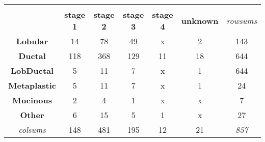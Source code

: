 \begin{table}[!h]
{\begin{tabular}{ccccccc}
                \multicolumn{1}{l}{} & \multicolumn{1}{l}{} & \multicolumn{1}{l}{} & \multicolumn{1}{l}{} & \multicolumn{1}{l}{} & \multicolumn{1}{l}{} & \multicolumn{1}{l}{} \\
                \multicolumn{1}{c|}{} & \multicolumn{1}{c|}{\textbf{stage 1}} & \multicolumn{1}{c|}{\textbf{stage 2}} & \multicolumn{1}{c|}{\textbf{stage 3}} & \multicolumn{1}{c|}{\textbf{stage 4}} & \multicolumn{1}{c|}{\textbf{unknown}} & {\color[HTML]{9B9B9B} \textit{rowsums}} \\ \hline
                \multicolumn{1}{c|}{\textbf{Lobular}} & \multicolumn{1}{c|}{14} & \multicolumn{1}{c|}{78} & \multicolumn{1}{c|}{49} & \multicolumn{1}{c|}{{\color[HTML]{C0C0C0} x}} & \multicolumn{1}{c|}{2} & \multicolumn{1}{c|}{143} \\ \hline
                \multicolumn{1}{c|}{\textbf{Ductal}} & \multicolumn{1}{c|}{118} & \multicolumn{1}{c|}{368} & \multicolumn{1}{c|}{129} & \multicolumn{1}{c|}{11} & \multicolumn{1}{c|}{18} & \multicolumn{1}{c|}{644} \\ \hline
                \multicolumn{1}{c|}{\textbf{LobDuctal}} & \multicolumn{1}{c|}{5} & \multicolumn{1}{c|}{11} & \multicolumn{1}{c|}{7} & \multicolumn{1}{c|}{{\color[HTML]{C0C0C0} x}} & \multicolumn{1}{c|}{1} & \multicolumn{1}{c|}{644} \\ \hline
                \multicolumn{1}{c|}{\textbf{Metaplastic}} & \multicolumn{1}{c|}{5} & \multicolumn{1}{c|}{11} & \multicolumn{1}{c|}{7} & \multicolumn{1}{c|}{{\color[HTML]{C0C0C0} x}} & \multicolumn{1}{c|}{1} & \multicolumn{1}{c|}{24} \\ \hline
                \multicolumn{1}{c|}{\textbf{Mucinous}} & \multicolumn{1}{c|}{2} & \multicolumn{1}{c|}{4} & \multicolumn{1}{c|}{1} & \multicolumn{1}{c|}{{\color[HTML]{C0C0C0} x}} & \multicolumn{1}{c|}{{\color[HTML]{C0C0C0} x}} & \multicolumn{1}{c|}{7} \\ \hline
                \multicolumn{1}{c|}{\textbf{Other}} & \multicolumn{1}{c|}{6} & \multicolumn{1}{c|}{15} & \multicolumn{1}{c|}{5} & \multicolumn{1}{c|}{1} & \multicolumn{1}{c|}{{\color[HTML]{C0C0C0} x}} & \multicolumn{1}{c|}{27} \\ \hline
                \multicolumn{1}{c|}{{\color[HTML]{9B9B9B} \textit{colsums}}} & \multicolumn{1}{c|}{148} & \multicolumn{1}{c|}{481} & \multicolumn{1}{c|}{195} & \multicolumn{1}{c|}{12} & \multicolumn{1}{c|}{21} & \multicolumn{1}{c|}{\textit{857}} \\ \cline{2-7} 
                \end{tabular}%
                }
                \end{table}


